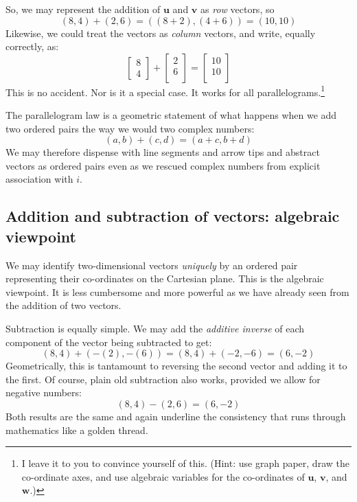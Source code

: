 \documentclass[
  a4paper,
]{article}
\begin{document}
So, we may represent the addition of \(\mathbf{u}\) and \(\mathbf{v}\)
as \emph{row} vectors, so \[
(8, 4) + (2, 6) = ((8+2), (4+6)) = (10, 10)
\] Likewise, we could treat the vectors as \emph{column} vectors, and
write, equally correctly, as: \[
\begin{bmatrix}8\\4\end{bmatrix}
+
\begin{bmatrix}2\\6\\\end{bmatrix}
=
\begin{bmatrix}10\\10\\\end{bmatrix}
\] This is no accident. Nor is it a special case. It works for all
parallelograms.\footnote{I leave it to you to convince yourself of this.
  (Hint: use graph paper, draw the co-ordinate axes, and use algebraic
  variables for the co-ordinates of \(\mathbf{u}\), \(\mathbf{v}\), and
  \(\mathbf{w}\).)}

The parallelogram law is a geometric statement of what happens when we
add two ordered pairs the way we would two complex numbers: \[
(a, b) + (c, d) = (a+c, b+d)
\] We may therefore dispense with line segments and arrow tips and
abstract vectors as ordered pairs even as we rescued complex numbers
from explicit association with \(i\).

\hypertarget{addition-and-subtraction-of-vectors-algebraic-viewpoint}{%
\subsection{Addition and subtraction of vectors: algebraic
viewpoint}\label{addition-and-subtraction-of-vectors-algebraic-viewpoint}}

We may identify two-dimensional vectors \emph{uniquely} by an ordered
pair representing their co-ordinates on the Cartesian plane. This is the
algebraic viewpoint. It is less cumbersome and more powerful as we have
already seen from the addition of two vectors.

Subtraction is equally simple. We may add the \emph{additive inverse} of
each component of the vector being subtracted to get: \[
(8, 4) + (-(2), -(6)) = (8, 4) + (-2, -6) = (6, -2)
\] Geometrically, this is tantamount to reversing the second vector and
adding it to the first. Of course, plain old subtraction also works,
provided we allow for negative numbers: \[
(8, 4) - (2, 6) = (6, -2)
\] Both results are the same and again underline the consistency that
runs through mathematics like a golden thread. 
\normalfont
\end{document}

